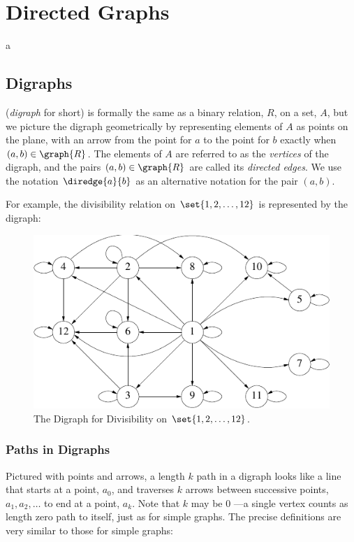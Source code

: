 \chapter{Directed Graphs}

a\section{Digraphs} 

 (\emph{digraph} for
short) is formally the same as a binary relation, $R$, on a set, $A$, but
we picture the digraph geometrically by representing elements of $A$ as
points on the plane, with an arrow from the point for $a$ to the point for
$b$ exactly when $(a,b) \in \graph{R}$.  The elements of $A$ are referred
to as the \emph{vertices} of the digraph, and the pairs $(a,b) \in
\graph{R}$ are called its \emph{directed edges}.  We use the notation
$\diredge{a}{b}$ as an alternative notation for the pair $(a,b)$.

For example, the divisibility relation on $\set{1,2,\dots,12}$ is
represented by the digraph:
\begin{figure}[h]
\centering \includegraphics{figures/divisibility.pdf}
\caption{The Digraph for Divisibility on $\set{1,2,\dots,12}$.}
\label{fig:divisibility-digraph}
\end{figure}


\subsection{Paths in Digraphs}\label{paths}

Pictured with points and arrows, a length $k$ path in a digraph looks like
a line that starts at a point, $a_0$, and traverses $k$ arrows between
successive points, $a_1,a_2,\dots$ to end at a point, $a_k$.  Note that
$k$ may be 0 ---a single vertex counts as length zero path to itself, just
as for simple graphs.  The precise definitions are very similar to those
for simple graphs:

